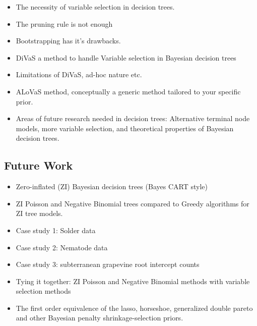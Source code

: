 \documentclass[12pt]{article}
\begin{document}
\begin{itemize}
\item The necessity of variable selection in decision trees. 
\item The pruning rule is not enough
\item Bootstrapping has it's drawbacks. 
\item DiVaS a method to handle Variable selection in Bayesian decision trees
\item Limitations of DiVaS, ad-hoc nature etc. 
\item ALoVaS method, conceptually a generic method tailored to your specific prior.
\item Areas of future research needed in decision trees: Alternative terminal node models, more variable selection, and theoretical properties of Bayesian decision trees.
\end{itemize}

\subsection{Future Work}

\begin{itemize}
\item Zero-inflated (ZI) Bayesian decision trees (Bayes CART style)
\item ZI Poisson and Negative Binomial trees compared to Greedy algorithms for ZI tree models. 
\item Case study 1: Solder data 
\item Case study 2: Nematode data 
\item Case study 3: subterranean grapevine root intercept counts
\item Tying it together: ZI Poisson and Negative Binomial methods with variable selection methods
\item The first order equivalence of the lasso, horseshoe, generalized double pareto and other Bayesian penalty shrinkage-selection priors. 
\end{itemize}

\pagebreak



\pagebreak

%




\end{document}
